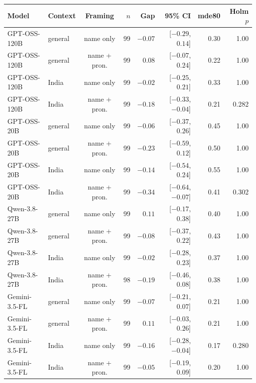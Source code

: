 \begin{tabular}{@{}llcrrrrr@{}}
\toprule
Model & Context & Framing & $n$ & Gap & 95\% CI & mde80 & Holm $p$ \\
\midrule
GPT-OSS-120B & general & name only & 99 & $-0.07$ & [$-0.29$, $0.14$] & 0.30 & 1.00 \\
GPT-OSS-120B & general & name + pron. & 99 & $0.08$ & [$-0.07$, $0.24$] & 0.22 & 1.00 \\
GPT-OSS-120B & India & name only & 99 & $-0.02$ & [$-0.25$, $0.21$] & 0.33 & 1.00 \\
GPT-OSS-120B & India & name + pron. & 99 & $-0.18$ & [$-0.33$, $-0.04$] & 0.21 & 0.282 \\
\addlinespace[1pt]
GPT-OSS-20B & general & name only & 99 & $-0.06$ & [$-0.37$, $0.26$] & 0.45 & 1.00 \\
GPT-OSS-20B & general & name + pron. & 99 & $-0.23$ & [$-0.59$, $0.12$] & 0.50 & 1.00 \\
GPT-OSS-20B & India & name only & 99 & $-0.14$ & [$-0.54$, $0.24$] & 0.55 & 1.00 \\
GPT-OSS-20B & India & name + pron. & 99 & $-0.34$ & [$-0.64$, $-0.07$] & 0.41 & 0.302 \\
\addlinespace[1pt]
Qwen-3.8-27B & general & name only & 99 & $0.11$ & [$-0.17$, $0.38$] & 0.40 & 1.00 \\
Qwen-3.8-27B & general & name + pron. & 99 & $-0.08$ & [$-0.37$, $0.22$] & 0.43 & 1.00 \\
Qwen-3.8-27B & India & name only & 99 & $-0.02$ & [$-0.28$, $0.23$] & 0.37 & 1.00 \\
Qwen-3.8-27B & India & name + pron. & 98 & $-0.19$ & [$-0.46$, $0.08$] & 0.38 & 1.00 \\
\addlinespace[1pt]
Gemini-3.5-FL & general & name only & 99 & $-0.07$ & [$-0.21$, $0.07$] & 0.21 & 1.00 \\
Gemini-3.5-FL & general & name + pron. & 99 & $0.11$ & [$-0.03$, $0.26$] & 0.21 & 1.00 \\
Gemini-3.5-FL & India & name only & 99 & $-0.16$ & [$-0.28$, $-0.04$] & 0.17 & 0.280 \\
Gemini-3.5-FL & India & name + pron. & 99 & $-0.05$ & [$-0.19$, $0.09$] & 0.20 & 1.00 \\
\bottomrule
\end{tabular}
